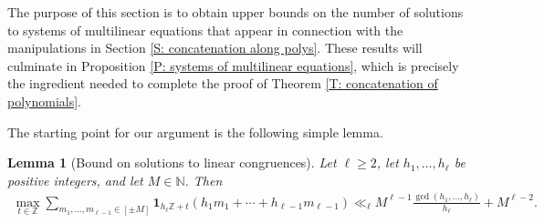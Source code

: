 \documentclass[11pt]{amsart}
\newtheorem{lemma}{Lemma}[section]
\theoremstyle{definition}
\newcommand{\N}{{\mathbb N}}
\newcommand{\Z}{{\mathbb Z}}
\begin{document}
The purpose of this section is to obtain upper bounds on the number of solutions to systems of multilinear equations that appear in connection with the manipulations in Section \ref{S: concatenation along polys}.
These results will culminate in Proposition \ref{P: systems of multilinear equations}, which is precisely the ingredient needed to complete the proof of Theorem \ref{T: concatenation of polynomials}.

The starting point for our argument is the following simple lemma. 
\begin{lemma}[Bound on solutions to linear congruences]\label{L: linear congruences}
    Let $\ell\geq 2$, let $h_1, \ldots, h_\ell$ be positive integers, and let $M\in\N$. Then
    \begin{align*}
        \max_{t\in\Z}\sum_{m_1, \ldots, m_{\ell-1}\in[\pm M]}\mathbf{1}_{h_\ell \mathbb{Z} + t}(h_1 m_1 + \cdots + h_{\ell-1} m_{\ell-1}) \ll_\ell M^{\ell-1}\frac{\gcd(h_1, \ldots, h_\ell)}{h_\ell} + M^{\ell-2}.
    \end{align*}
\end{lemma}
\end{document}
